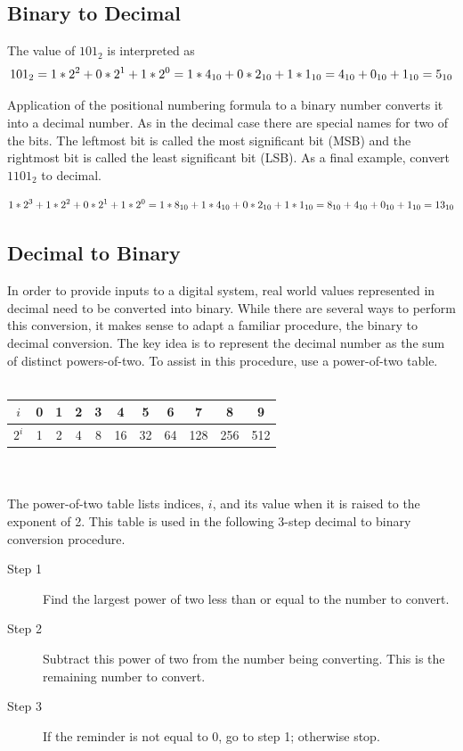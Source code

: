 \subsection{Binary to Decimal}
The value of $101_2$ is interpreted as 
$$101_2 = 1*2^2 + 0*2^1 + 1*2^0 = \\
1*4_{10} + 0*2_{10} + 1*1_{10} = \\
4_{10} + 0_{10} + 1_{10} = 5_{10}$$

Application of the positional numbering formula to a binary number
converts it into a decimal number.  As in the decimal case 
there are special names for two of the bits. The leftmost bit is 
called the most significant bit (MSB) and the 
rightmost bit is called the least significant 
bit (LSB).  As a final example, convert $1101_2$ to decimal.

$$1*2^3 + 1*2^2 + 0*2^1 + 1*2^0 = \\
1*8_{10} + 1*4_{10} + 0*2_{10} + 1*1_{10} = \\
8_{10} + 4_{10} + 0_{10} + 1_{10} = 13_{10}$$
\label{page:bin2dec}


\subsection{Decimal to Binary}
In order to provide inputs to a digital system, real world values
represented in decimal need to be converted into binary.
While there are several ways to perform
this conversion, it makes sense to adapt a familiar procedure, 
the binary to decimal conversion.  The key idea is to represent the 
decimal number as the sum of distinct powers-of-two.  To assist in this
procedure, use a power-of-two table.
\\ \\
\begin{tabular}{|c|c|c|c|c|c|c|c|c|c|c|}\hline
$i$   & 0 & 1 &  2 &  3 &  4 &  5 &  6 &  7  &  8  &  9  \\ \hline
$2^i$ & 1 & 2 &  4 &  8 & 16 & 32 & 64 & 128 & 256 &  512\\ \hline 
\end{tabular}
\\ \\
The power-of-two table lists indices, $i$, and its value when it is
raised to the exponent of 2.  This table is used in the following
3-step decimal to binary conversion procedure.

\begin{description}
\item [Step 1] Find the largest power of two less than or equal to the 
number to convert.  
\item [Step 2] Subtract this power of two from the number being converting.
This is the remaining number to convert.
\item [Step 3] If the reminder is not equal to 0, go to step 1; otherwise stop.
\end{description}

